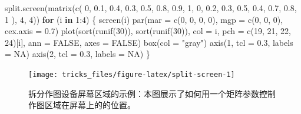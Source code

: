 \documentclass[
  b5paper,
  UTF8,twoside]{book}
\newenvironment{Shaded}{\begin{snugshade}}{\end{snugshade}}
\newcommand{\AttributeTok}[1]{\textcolor[rgb]{0.77,0.63,0.00}{#1}}
\newcommand{\ConstantTok}[1]{\textcolor[rgb]{0.00,0.00,0.00}{#1}}
\newcommand{\ControlFlowTok}[1]{\textcolor[rgb]{0.13,0.29,0.53}{\textbf{#1}}}
\newcommand{\DecValTok}[1]{\textcolor[rgb]{0.00,0.00,0.81}{#1}}
\newcommand{\FloatTok}[1]{\textcolor[rgb]{0.00,0.00,0.81}{#1}}
\newcommand{\FunctionTok}[1]{\textcolor[rgb]{0.00,0.00,0.00}{#1}}
\newcommand{\NormalTok}[1]{#1}
\newcommand{\SpecialCharTok}[1]{\textcolor[rgb]{0.00,0.00,0.00}{#1}}
\newcommand{\StringTok}[1]{\textcolor[rgb]{0.31,0.60,0.02}{#1}}
\begin{document}
\begin{Shaded}
\begin{Highlighting}[]
\FunctionTok{split.screen}\NormalTok{(}\FunctionTok{matrix}\NormalTok{(}\FunctionTok{c}\NormalTok{(}
  \DecValTok{0}\NormalTok{, }\FloatTok{0.1}\NormalTok{, }\FloatTok{0.4}\NormalTok{, }\FloatTok{0.3}\NormalTok{, }\FloatTok{0.5}\NormalTok{, }\FloatTok{0.8}\NormalTok{,}
  \FloatTok{0.9}\NormalTok{, }\DecValTok{1}\NormalTok{, }\DecValTok{0}\NormalTok{, }\FloatTok{0.2}\NormalTok{, }\FloatTok{0.3}\NormalTok{, }\FloatTok{0.5}\NormalTok{, }\FloatTok{0.4}\NormalTok{, }\FloatTok{0.7}\NormalTok{, }\FloatTok{0.8}\NormalTok{, }\DecValTok{1}
\NormalTok{), }\DecValTok{4}\NormalTok{, }\DecValTok{4}\NormalTok{))}
\ControlFlowTok{for}\NormalTok{ (i }\ControlFlowTok{in} \DecValTok{1}\SpecialCharTok{:}\DecValTok{4}\NormalTok{) \{}
  \FunctionTok{screen}\NormalTok{(i)}
  \FunctionTok{par}\NormalTok{(}\AttributeTok{mar =} \FunctionTok{c}\NormalTok{(}\DecValTok{0}\NormalTok{, }\DecValTok{0}\NormalTok{, }\DecValTok{0}\NormalTok{, }\DecValTok{0}\NormalTok{), }\AttributeTok{mgp =} \FunctionTok{c}\NormalTok{(}\DecValTok{0}\NormalTok{, }\DecValTok{0}\NormalTok{, }\DecValTok{0}\NormalTok{), }\AttributeTok{cex.axis =} \FloatTok{0.7}\NormalTok{)}
  \FunctionTok{plot}\NormalTok{(}\FunctionTok{sort}\NormalTok{(}\FunctionTok{runif}\NormalTok{(}\DecValTok{30}\NormalTok{)), }\FunctionTok{sort}\NormalTok{(}\FunctionTok{runif}\NormalTok{(}\DecValTok{30}\NormalTok{)), }\AttributeTok{col =}\NormalTok{ i, }
       \AttributeTok{pch =} \FunctionTok{c}\NormalTok{(}\DecValTok{19}\NormalTok{, }\DecValTok{21}\NormalTok{, }\DecValTok{22}\NormalTok{, }\DecValTok{24}\NormalTok{)[i], }\AttributeTok{ann =} \ConstantTok{FALSE}\NormalTok{, }\AttributeTok{axes =} \ConstantTok{FALSE}\NormalTok{)}
  \FunctionTok{box}\NormalTok{(}\AttributeTok{col =} \StringTok{"gray"}\NormalTok{)}
  \FunctionTok{axis}\NormalTok{(}\DecValTok{1}\NormalTok{, }\AttributeTok{tcl =} \FloatTok{0.3}\NormalTok{, }\AttributeTok{labels =} \ConstantTok{NA}\NormalTok{)}
  \FunctionTok{axis}\NormalTok{(}\DecValTok{2}\NormalTok{, }\AttributeTok{tcl =} \FloatTok{0.3}\NormalTok{, }\AttributeTok{labels =} \ConstantTok{NA}\NormalTok{)}
\NormalTok{\}}
\end{Highlighting}
\end{Shaded}

\begin{figure}

{\centering \texttt{[image: tricks\_files/figure-latex/split-screen-1]} 

}

\caption[拆分作图设备屏幕区域的示例]{拆分作图设备屏幕区域的示例：本图展示了如何用一个矩阵参数控制作图区域在屏幕上的的位置。}\label{fig:split-screen}
\end{figure}
\end{document}
